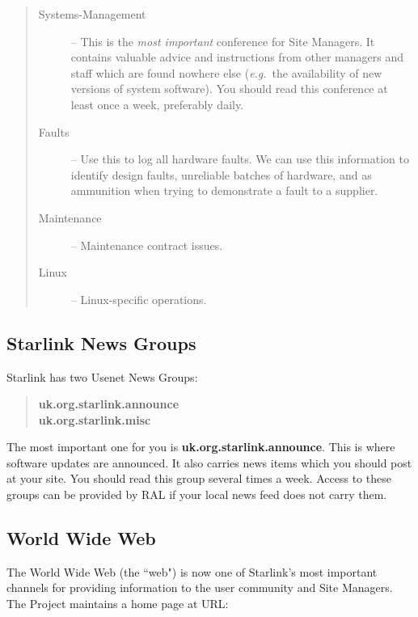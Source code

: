 \begin{quote}
\begin{description}
\item [Systems-Management] --
 This is the {\em most important} conference for Site Managers.
 It contains valuable advice and instructions from other managers and
 staff which are found nowhere else ({\em e.g.}\ the availability of new
 versions of system software).
 You should read this conference at least once a week, preferably daily.
\item [Faults] --
 Use this to log all hardware faults.
 We can use this information to identify design faults, unreliable batches of
 hardware, and as ammunition when trying to demonstrate a fault to a supplier. 
\item [Maintenance] --
 Maintenance contract issues.
\item [Linux] --
 Linux-specific operations.
\end{description}
\end{quote}

\subsection{Starlink News Groups}

Starlink has two Usenet News Groups:

\begin{quote}
{\bf uk.org.starlink.announce\\
     uk.org.starlink.misc}
\end{quote}

The most important one for you is {\bf uk.org.starlink.announce}.
This is where software updates are announced.
It also carries news items which you should post at your site.
You should read this group several times a week. 
Access to these groups can be provided by RAL if your local news feed
does not carry them.

\subsection{\label{web}World Wide Web}

The World Wide Web (the ``web") is now one of Starlink's most important
channels for providing information to the user community and Site Managers.
The Project maintains a home page at URL:

\begin{quote}
\end{quote}

